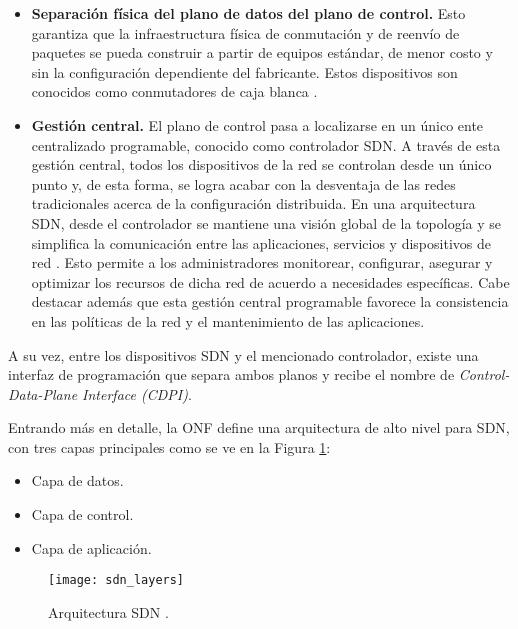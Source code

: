 \begin{itemize}
\item \textbf{Separación física del plano de datos del plano de control.} Esto
  garantiza que la infraestructura física de conmutación y de reenvío de paquetes
  se pueda construir a partir de equipos estándar, de menor costo y sin la
  configuración dependiente del fabricante. Estos dispositivos son conocidos como
  conmutadores de caja blanca \parencite{sdn_approach}.
\item \textbf{Gestión central.} El plano de control pasa a localizarse en un
  único ente centralizado programable, conocido como controlador SDN. A través de
  esta gestión central, todos los dispositivos de la red se controlan desde un
  único punto y, de esta forma, se logra acabar con la desventaja de las redes
  tradicionales acerca de la configuración distribuida. En una arquitectura SDN,
  desde el controlador se mantiene una visión global de la topología y se
  simplifica la comunicación entre las aplicaciones, servicios y dispositivos de
  red \parencite{sdn_oreilly}. Esto permite a los administradores monitorear,
  configurar, asegurar y optimizar los recursos de dicha red de acuerdo a
  necesidades específicas. Cabe destacar además que esta gestión central
  programable favorece la consistencia en las políticas de la red y el
  mantenimiento de las aplicaciones.
\end{itemize}

A su vez, entre los dispositivos SDN y el mencionado controlador, existe una interfaz de
programación que separa ambos planos y recibe el nombre de
\textit{Control-Data-Plane Interface (CDPI)}.

Entrando más en detalle, la ONF define una arquitectura de alto nivel para SDN,
con tres capas principales como se ve en la Figura \ref{fig:layers}:

\begin{itemize}
\item Capa de datos.
\item Capa de control.
\item Capa de aplicación.
\end{itemize}

\begin{figure}[H]
	\centering 
  \texttt{[image: sdn\_layers]}
	\caption[Arquitectura SDN.]{Arquitectura SDN \parencite{onf}.}
	\label{fig:layers}
\end{figure}


